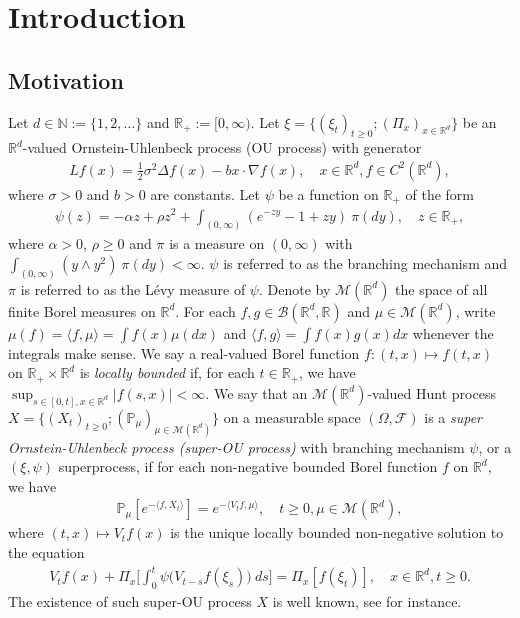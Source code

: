 \documentclass[12pt,a4paper]{amsart}
\theoremstyle{plain}
\theoremstyle{definition}
\numberwithin{equation}{section}
\begin{document}
\section{Introduction}
\subsection{Motivation}
\label{subsec:M}
Let $d \in \mathbb N:= \{1,2,\dots\}$ and $\mathbb R_+:= [0,\infty)$.
Let $\xi=\{(\xi_t)_{t\geq 0}; (\Pi_x)_{x\in \mathbb R^d}\}$ be an $\mathbb R^d$-valued Ornstein-Uhlenbeck process (OU process) with generator
\begin{align}
  Lf(x)
  = \frac{1}{2}\sigma^2\Delta f(x)-b x \cdot \nabla f(x)
  , \quad  x\in \mathbb R^d, f \in C^2(\mathbb R^d),
\end{align}
where $\sigma > 0$ and $b > 0$ are constants.
Let $\psi$ be a function on $\mathbb R_+$ of the form
\begin{align}
  \label{eq: honogeneou branching mechanism}
  \psi(z)=
  - \alpha z + \rho z^2 + \int_{(0,\infty)} (e^{-zy} - 1 + zy)~\pi(dy)
  , \quad  z \in \mathbb R_+,
\end{align}
where $\alpha > 0 $, $\rho \geq0$ and $\pi$ is a measure on $(0,\infty)$ with $\int_{(0,\infty)}(y\wedge y^2)~\pi(dy)< \infty$.
$\psi$ is referred to as the branching mechanism and $\pi$ is referred to as the L\'evy measure of $\psi$.
Denote by $\mathcal M(\mathbb R^d)$ the space of all finite Borel measures on $\mathbb R^d$.
For each $f,g\in \mathcal B(\mathbb R^d, \mathbb R)$ and $\mu \in \mathcal M(\mathbb R^d)$, write $\mu(f)=\langle f,\mu\rangle = \int f(x)\mu(dx)$ and $\langle f, g\rangle = \int f(x)g(x) dx$ whenever the integrals make sense.
We say a real-valued Borel function $f:(t,x)\mapsto f(t,x)$ on $\mathbb R_+\times \mathbb R^d$ is \emph{locally bounded} if, for each $t\in \mathbb R_+$, we have $ \sup_{s\in [0,t],x\in \mathbb R^d} |f(s,x)|<\infty. $
We say that an $\mathcal M(\mathbb R^d)$-valued Hunt process $X = \{(X_t)_{t\geq 0}; (\mathbb{P}_{\mu})_{\mu \in \mathcal M(\mathbb R^d)}\}$ on a measurable space $(\Omega, \mathcal{F})$ is a \emph{super Ornstein-Uhlenbeck process (super-OU process)} with branching mechanism $\psi$, or a $(\xi, \psi)$ superprocess, if for each non-negative bounded Borel function $f$ on $\mathbb R^d$, we have
\begin{align}
  \label{eq: def of V_t}
  \mathbb{P}_{\mu}[e^{-\langle f,X_t \rangle}]
  = e^{-\langle V_tf, \mu \rangle}
  , \quad t\geq 0, \mu \in \mathcal M(\mathbb R^d),
\end{align}
where $(t,x) \mapsto V_tf(x)$ is the unique locally bounded non-negative solution to the equation
\begin{align}
  V_tf(x) + \Pi_x \Big[ \int_0^t\psi\big(V_{t-s}f(\xi_s)\big)~ds\Big]
	= \Pi_x [f(\xi_t)]
  , \quad x\in \mathbb R^d, t\geq 0.
\end{align}	
The existence of such super-OU process $X$ is well known, see \cite{Dynkin1993Superprocesses} for instance.
\end{document}
